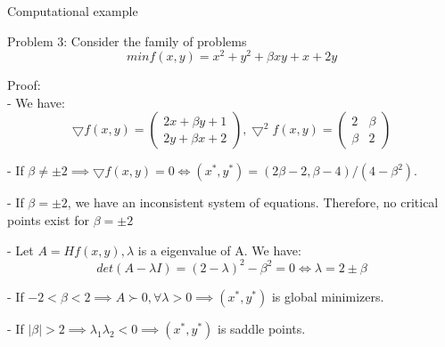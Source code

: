     \begin{frame}{Computational example}
        \begin{block}{Problem 3:  Consider the family of problems}
            \begin{equation}
                min f(x,y) = x^2 + y^2 +\beta xy + x + 2y
            \end{equation}
        \end{block}
        Proof: \\
        - We have:
        \begin{equation}
            \bigtriangledown f(x, y) = \begin{pmatrix}
                2x + \beta y  +1 \\
                2y + \beta x  +2
            \end{pmatrix}, 
            \bigtriangledown^2 f(x, y) = \begin{pmatrix}
                2 & \beta \\
                \beta & 2
            \end{pmatrix}
        \end{equation}

        - If $\beta \ne \pm 2 \implies$$\bigtriangledown f(x,y) = 0 \Leftrightarrow (x^*,y^*) = (2\beta -2, \beta-4) / (4-\beta^2)$.

        - If $\beta = \pm 2$, we have an inconsistent system of equations. Therefore, no critical points exist for $\beta = \pm 2$
        
       - Let $A = Hf(x,y), \lambda$ is a eigenvalue of A. We have:
       \begin{equation}
           det(A-\lambda I) = (2 - \lambda)^2 - \beta ^2 = 0 \Leftrightarrow \lambda = 2 \pm \beta
       \end{equation}

       - If $-2 < \beta < 2 \implies A \succ 0, \forall \lambda > 0 \implies (x^*, y^*)$ is global minimizers.
       
       - If $|\beta | > 2 \implies \lambda_1 \lambda_2 < 0 \implies (x^*, y^*)$ is saddle points.
    \end{frame}